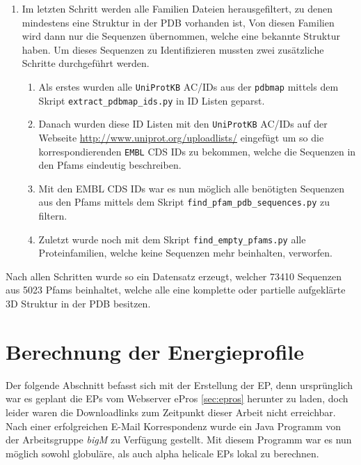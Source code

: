 \begin{enumerate}
\begin{enumerate}
    \end{enumerate}
\item
    Im letzten Schritt werden alle Familien Dateien herausgefiltert, zu denen mindestens eine Struktur in der \ac{PDB} vorhanden ist, Von diesen Familien wird dann nur die Sequenzen übernommen, welche eine bekannte Struktur haben. Um dieses Sequenzen zu Identifizieren mussten zwei zusätzliche Schritte durchgeführt werden.
    \begin{enumerate}
        \item
        Als erstes wurden alle \texttt{UniProtKB} AC/IDs aus der \texttt{pdbmap} mittels dem Skript \texttt{extract\_pdbmap\_ids.py} in ID Listen geparst. 
        \item
        Danach wurden diese ID Listen mit den \texttt{UniProtKB} AC/IDs auf der Webseite \url{http://www.uniprot.org/uploadlists/} eingefügt um so die korrespondierenden \texttt{EMBL} CDS IDs zu bekommen, welche die Sequenzen in den Pfams eindeutig beschreiben.
        \item
        Mit den EMBL CDS IDs war es nun möglich alle benötigten Sequenzen aus den Pfams mittels dem Skript \texttt{find\_pfam\_pdb\_sequences.py} zu filtern.
        \item
        Zuletzt wurde noch mit dem Skript \texttt{find\_empty\_pfams.py} alle Proteinfamilien, welche keine Sequenzen mehr beinhalten, verworfen. 
    \end{enumerate}
\end{enumerate}

Nach allen Schritten wurde so ein Datensatz erzeugt, welcher 73410 Sequenzen aus 5023 \ac{Pfams} beinhaltet, welche alle eine komplette oder partielle aufgeklärte 3D Struktur in der \ac{PDB} besitzen.




\section{Berechnung der Energieprofile}
\label{sec:calc_ep}
Der folgende Abschnitt befasst sich mit der Erstellung der \acf{EP}, denn ursprünglich war es geplant die \ac{EPs}  vom Webserver ePros \ref{sec:epros} herunter zu laden, doch leider waren die Downloadlinks zum Zeitpunkt dieser Arbeit nicht erreichbar. Nach einer erfolgreichen E-Mail Korrespondenz wurde ein Java Programm von der Arbeitsgruppe \emph{bigM} zu Verfügung gestellt. Mit diesem Programm war es nun möglich sowohl globuläre, als auch alpha helicale \ac{EPs}  lokal zu berechnen. 

